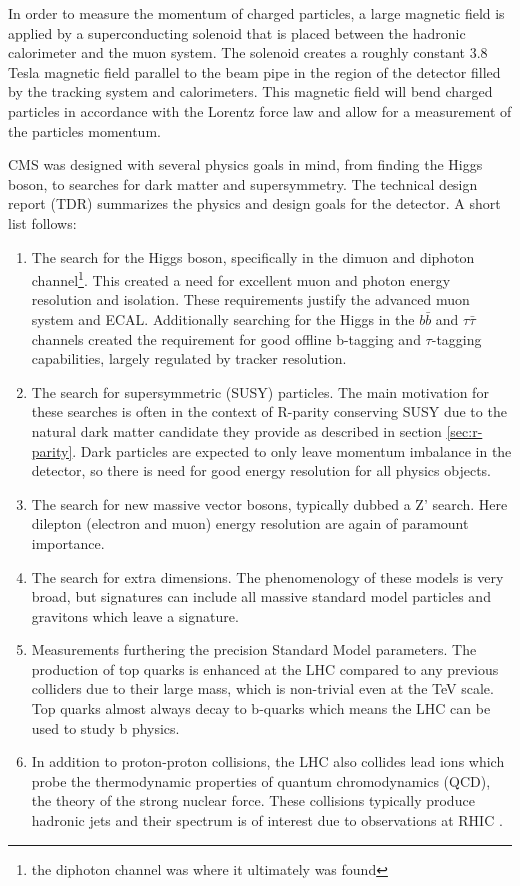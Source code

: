   In order to measure the momentum of charged particles, a large magnetic field is applied by a superconducting solenoid that is placed between the hadronic calorimeter and the muon system. The solenoid creates a roughly constant 3.8 Tesla magnetic field parallel to the beam pipe in the region of the detector filled by the tracking system and calorimeters. This magnetic field will bend charged particles in accordance with the Lorentz force law and allow for a measurement of the particles momentum.

  CMS was designed with several physics goals in mind, from finding the Higgs boson, to searches for dark matter and supersymmetry. The technical design report (TDR) \cite{cms_tdr} summarizes the physics and design goals for the detector. A short list follows:

  \begin{enumerate}
    \item The search for the Higgs boson, specifically in the dimuon and diphoton channel\footnote{the diphoton channel was where it ultimately was found}. This created a need for excellent muon and photon energy resolution and isolation. These requirements justify the advanced muon system and ECAL. Additionally searching for the Higgs in the $b\bar{b}$ and $\tau \bar{\tau}$ channels created the requirement for good offline b-tagging and $\tau$-tagging capabilities, largely regulated by tracker resolution.
    \item The search for supersymmetric (SUSY) particles. The main motivation for these searches is often in the context of R-parity conserving SUSY due to the natural dark matter candidate they provide as described in section \ref{sec:r-parity}. Dark particles are expected to only leave momentum imbalance in the detector, so there is need for good energy resolution for all physics objects. 
    \item The search for new massive vector bosons, typically dubbed a Z' search. Here dilepton (electron and muon) energy resolution are again of paramount importance.
    \item The search for extra dimensions. The phenomenology of these models is very broad, but signatures can include all massive standard model particles and gravitons which leave a \MET signature.
    \item Measurements furthering the precision Standard Model parameters. The production of top quarks is enhanced at the LHC compared to any previous colliders due to their large mass, which is non-trivial even at the TeV scale. Top quarks almost always decay to b-quarks which means the LHC can be used to study b physics.
    \item In addition to proton-proton collisions, the LHC also collides lead ions which probe the thermodynamic properties of quantum chromodynamics (QCD), the theory of the strong nuclear force. These collisions typically produce hadronic jets and their \pt spectrum is of interest due to observations at RHIC \cite{QCD_collider_physics}.
  \end{enumerate}

